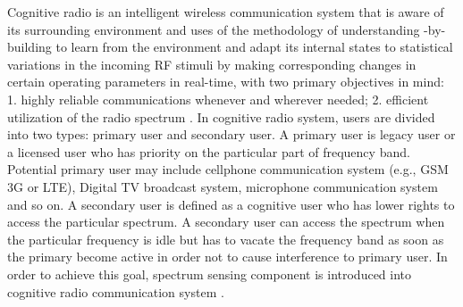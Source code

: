 \documentclass{report}
\begin{document}
\begin{spacing}{2.0}
Cognitive radio is an intelligent wireless communication system that is aware of its surrounding environment and uses of the methodology of understanding -by-building to learn from the environment and adapt its internal states to statistical variations in the incoming RF stimuli by making corresponding changes in certain operating parameters in real-time, with two primary objectives in mind: 1. highly reliable communications whenever and wherever needed; 2. efficient utilization of the radio spectrum \cite{a001}. In cognitive radio system, users are divided into two types: primary user and secondary user. A primary user is legacy user or a licensed user who has priority on the particular part of frequency band.  Potential primary user may include cellphone communication system (e.g., GSM 3G or LTE), Digital TV broadcast system, microphone communication system and so on. A secondary user is defined as a cognitive user who has lower rights to access the particular spectrum. A secondary user can access the spectrum when the particular frequency is idle but has to vacate the frequency band as soon as the primary become active in order not to cause interference to primary user. In order to achieve this goal, spectrum sensing component is introduced into cognitive radio communication system \cite{buddhikot2007understanding} \cite{tandra2009spectrum}.   


\end{spacing}
\end{document}
